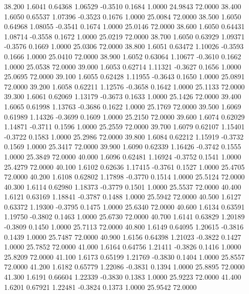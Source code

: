   38.200   1.6041   0.64368   1.06529  -0.3510   0.1684   1.0000  24.9843  72.0000
  38.400   1.6050   0.65537   1.07396  -0.3523   0.1676   1.0000  25.0084  72.0000
  38.500   1.6050   0.64968   1.08055  -0.3541   0.1674   1.0000  25.0146  72.0000
  38.600   1.6050   0.64431   1.08714  -0.3558   0.1672   1.0000  25.0219  72.0000
  38.700   1.6050   0.63929   1.09371  -0.3576   0.1669   1.0000  25.0306  72.0000
  38.800   1.6051   0.63472   1.10026  -0.3593   0.1666   1.0000  25.0410  72.0000
  38.900   1.6052   0.63064   1.10677  -0.3610   0.1662   1.0000  25.0538  72.0000
  39.000   1.6053   0.62714   1.11321  -0.3627   0.1656   1.0000  25.0695  72.0000
  39.100   1.6055   0.62428   1.11955  -0.3643   0.1650   1.0000  25.0891  72.0000
  39.200   1.6058   0.62211   1.12576  -0.3658   0.1642   1.0000  25.1133  72.0000
  39.300   1.6061   0.62069   1.13179  -0.3673   0.1633   1.0000  25.1426  72.0000
  39.400   1.6065   0.61998   1.13763  -0.3686   0.1622   1.0000  25.1769  72.0000
  39.500   1.6069   0.61989   1.14326  -0.3699   0.1609   1.0000  25.2150  72.0000
  39.600   1.6074   0.62029   1.14871  -0.3711   0.1596   1.0000  25.2559  72.0000
  39.700   1.6079   0.62107   1.15401  -0.3722   0.1583   1.0000  25.2986  72.0000
  39.800   1.6084   0.62212   1.15919  -0.3732   0.1569   1.0000  25.3417  72.0000
  39.900   1.6090   0.62339   1.16426  -0.3742   0.1555   1.0000  25.3849  72.0000
  40.000   1.6096   0.62481   1.16924  -0.3752   0.1541   1.0000  25.4279  72.0000
  40.100   1.6102   0.62636   1.17415  -0.3761   0.1527   1.0000  25.4705  72.0000
  40.200   1.6108   0.62802   1.17898  -0.3770   0.1514   1.0000  25.5124  72.0000
  40.300   1.6114   0.62980   1.18373  -0.3779   0.1501   1.0000  25.5537  72.0000
  40.400   1.6121   0.63169   1.18841  -0.3787   0.1488   1.0000  25.5942  72.0000
  40.500   1.6127   0.63372   1.19300  -0.3795   0.1475   1.0000  25.6340  72.0000
  40.600   1.6134   0.63591   1.19750  -0.3802   0.1463   1.0000  25.6730  72.0000
  40.700   1.6141   0.63829   1.20189  -0.3809   0.1450   1.0000  25.7113  72.0000
  40.800   1.6149   0.64095   1.20615  -0.3816   0.1439   1.0000  25.7487  72.0000
  40.900   1.6156   0.64398   1.21023  -0.3822   0.1427   1.0000  25.7852  72.0000
  41.000   1.6164   0.64756   1.21411  -0.3826   0.1416   1.0000  25.8209  72.0000
  41.100   1.6173   0.65199   1.21769  -0.3830   0.1404   1.0000  25.8557  72.0000
  41.200   1.6182   0.65779   1.22086  -0.3831   0.1394   1.0000  25.8895  72.0000
  41.300   1.6191   0.66604   1.22339  -0.3830   0.1383   1.0000  25.9223  72.0000
  41.400   1.6201   0.67921   1.22481  -0.3824   0.1373   1.0000  25.9542  72.0000
